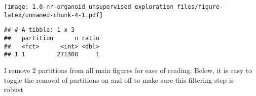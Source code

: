 \documentclass[
]{article}
\newenvironment{Shaded}{\begin{snugshade}}{\end{snugshade}}
\newcommand{\DataTypeTok}[1]{\textcolor[rgb]{0.13,0.29,0.53}{#1}}
\newcommand{\KeywordTok}[1]{\textcolor[rgb]{0.13,0.29,0.53}{\textbf{#1}}}
\newcommand{\NormalTok}[1]{#1}
\newcommand{\OperatorTok}[1]{\textcolor[rgb]{0.81,0.36,0.00}{\textbf{#1}}}
\newcommand{\StringTok}[1]{\textcolor[rgb]{0.31,0.60,0.02}{#1}}
\begin{document}
\texttt{[image: 1.0-nr-organoid\_unsupervised\_exploration\_files/figure-latex/unnamed-chunk-4-1.pdf]}

\begin{Shaded}
\end{Shaded}

\begin{verbatim}
## # A tibble: 1 x 3
##   partition      n ratio
##   <fct>      <int> <dbl>
## 1 1         271308     1
\end{verbatim}

I remove 2 partitions from all main figures for ease of reading. Below,
it is easy to toggle the removal of partitions on and off to make sure
this filtering step is robust
\end{document}
